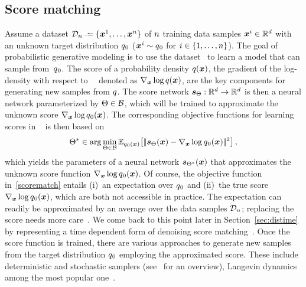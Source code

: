 \subsection{Score matching}
Assume a dataset $\dataset\deq\{\x^1,\dots, \x^{\dn}\}$ of $\dn$ training data  samples $\x^i\in \R^{\Dim}$ with an unknown target distribution $\q_0$ ($\x^i\sim \q_0$ for $i\in\{1,\dots,\dn\}$). 
The goal of probabilistic generative modeling is to use the dataset \dataset\ to learn a model that can sample from~$\q_0$.
The score of a probability density $\q(\x)$, 
the gradient of the log-density with respect to~\x~
 denoted as $\nabla_{\x} \log \q(\x)$,
 are the key components for generating new samples from $\Fdd$.
The score network $\scoref : \R^{\Dim} \to \R^{\Dim}$ is then a neural network parameterized by $\NetP\in \paramspace$, which will be trained to approximate the unknown score $\nabla_{\x} \log \q_0(\x)$. 
The corresponding objective functions for learning scores in \sgm~\citep{song2019generative} is then based on~\citet{hyvarinen2005estimation,hyvarinen2007some}
\begin{equation}\label{scorematch}
 \NetPS\in \arg \min_{\NetP\in \paramspace} \E_{\q_0(\x)}\bigl[\norm{\scoref(\x)-\nabla_{\x}\log \q_0(\x)}^2\bigr]\,,   
\end{equation}
which yields the parameters of a neural network  
$\scorefS(\x)$ that approximates the unknown score function $\nabla_{\x}\log \q_0(\x)$.
Of course, 
the objective function in~\eqref{scorematch} entails (i)~an expectation over $\q_0$ and (ii)~the true score~$\nabla_{\x}\log \q_0(\x)$,
which are both not accessible in practice.
The expectation can readily be approximated by an average over the data samples $\dataset$;
replacing the score needs more care~\citep{vincent2011connection,song2020sliced}.
We come back to this point later  in Section~\ref{sec:distime} by representing  a time dependent form of denoising score matching~\citep{vincent2011connection}.
Once the score function is trained, there are various approaches to generate new samples from the target distribution $\q_0$ employing the approximated score.
These include deterministic and stochastic samplers (see~\citet{li2023towards} for an overview), Langevin dynamics among the most popular one~\cite{song2019generative}.




